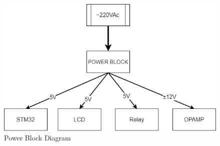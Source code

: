 \begin{enumerate}[label=\alph*) ]
	\begin{figure}[H]
		\includegraphics[width=\linewidth]{picture/power supply.png}
		\caption{Power Block Diagram}
		\label{t_power block diagram}
	\end{figure}
\end{enumerate}
